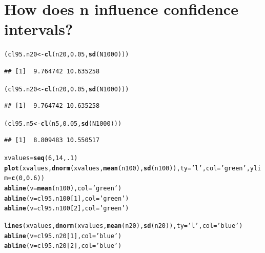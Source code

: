 \documentclass{tufte-handout}\usepackage[]{graphicx}\usepackage[]{color}
\makeatletter
\newcommand{\hlnum}[1]{\textcolor[rgb]{0.686,0.059,0.569}{#1}}%
\newcommand{\hlstr}[1]{\textcolor[rgb]{0.192,0.494,0.8}{#1}}%
\newcommand{\hlstd}[1]{\textcolor[rgb]{0.345,0.345,0.345}{#1}}%
\newcommand{\hlkwb}[1]{\textcolor[rgb]{0.69,0.353,0.396}{#1}}%
\newcommand{\hlkwc}[1]{\textcolor[rgb]{0.333,0.667,0.333}{#1}}%
\newcommand{\hlkwd}[1]{\textcolor[rgb]{0.737,0.353,0.396}{\textbf{#1}}}%
\newenvironment{kframe}{%
 \def\at@end@of@kframe{}%
 \ifinner\ifhmode%
  \def\at@end@of@kframe{\end{minipage}}%
  \begin{minipage}{\columnwidth}%
 \fi\fi%
 \def\FrameCommand##1{\hskip\@totalleftmargin \hskip-\fboxsep
 \colorbox{shadecolor}{##1}\hskip-\fboxsep
     \hskip-\linewidth \hskip-\@totalleftmargin \hskip\columnwidth}%
 \MakeFramed {\advance\hsize-\width
   \@totalleftmargin\z@ \linewidth\hsize
   \@setminipage}}%
 {\par\unskip\endMakeFramed%
 \at@end@of@kframe}
\newenvironment{knitrout}{}{} %
\makeatother
\begin{document}
\section{How does n influence confidence intervals?}

\begin{knitrout}
\color{fgcolor}\begin{kframe}
\begin{alltt}
\hlstd{(cl95.n20} \hlkwb{<-} \hlkwd{cl}\hlstd{(n20,} \hlnum{0.05}\hlstd{,} \hlkwd{sd}\hlstd{(N1000)))}
\end{alltt}
\begin{verbatim}
## [1]  9.764742 10.635258
\end{verbatim}
\begin{alltt}
\hlstd{(cl95.n20} \hlkwb{<-} \hlkwd{cl}\hlstd{(n20,} \hlnum{0.05}\hlstd{,} \hlkwd{sd}\hlstd{(N1000)))}
\end{alltt}
\begin{verbatim}
## [1]  9.764742 10.635258
\end{verbatim}
\begin{alltt}
\hlstd{(cl95.n5} \hlkwb{<-} \hlkwd{cl}\hlstd{(n5,} \hlnum{0.05}\hlstd{,} \hlkwd{sd}\hlstd{(N1000)))}
\end{alltt}
\begin{verbatim}
## [1]  8.809483 10.550517
\end{verbatim}
\begin{alltt}
\hlstd{xvalues} \hlkwb{=} \hlkwd{seq}\hlstd{(}\hlnum{6}\hlstd{,}\hlnum{14}\hlstd{,}\hlnum{.1}\hlstd{)}
\hlkwd{plot}\hlstd{(xvalues,} \hlkwd{dnorm}\hlstd{(xvalues,} \hlkwd{mean}\hlstd{(n100),} \hlkwd{sd}\hlstd{(n100)),} \hlkwc{ty}\hlstd{=}\hlstr{'l'}\hlstd{,} \hlkwc{col}\hlstd{=}\hlstr{'green'}\hlstd{,} \hlkwc{ylim}\hlstd{=}\hlkwd{c}\hlstd{(}\hlnum{0}\hlstd{,} \hlnum{0.6}\hlstd{))}
\hlkwd{abline}\hlstd{(}\hlkwc{v}\hlstd{=}\hlkwd{mean}\hlstd{(n100),} \hlkwc{col}\hlstd{=}\hlstr{'green'}\hlstd{)}
\hlkwd{abline}\hlstd{(}\hlkwc{v}\hlstd{=cl95.n100[}\hlnum{1}\hlstd{],} \hlkwc{col}\hlstd{=}\hlstr{'green'}\hlstd{)}
\hlkwd{abline}\hlstd{(}\hlkwc{v}\hlstd{=cl95.n100[}\hlnum{2}\hlstd{],} \hlkwc{col}\hlstd{=}\hlstr{'green'}\hlstd{)}

\hlkwd{lines}\hlstd{(xvalues,} \hlkwd{dnorm}\hlstd{(xvalues,} \hlkwd{mean}\hlstd{(n20),} \hlkwd{sd}\hlstd{(n20)),} \hlkwc{ty}\hlstd{=}\hlstr{'l'}\hlstd{,} \hlkwc{col}\hlstd{=}\hlstr{'blue'}\hlstd{)}
\hlkwd{abline}\hlstd{(}\hlkwc{v}\hlstd{=cl95.n20[}\hlnum{1}\hlstd{],} \hlkwc{col}\hlstd{=}\hlstr{'blue'}\hlstd{)}
\hlkwd{abline}\hlstd{(}\hlkwc{v}\hlstd{=cl95.n20[}\hlnum{2}\hlstd{],} \hlkwc{col}\hlstd{=}\hlstr{'blue'}\hlstd{)}


\end{alltt}
\end{kframe}
\end{knitrout}
\end{document}
